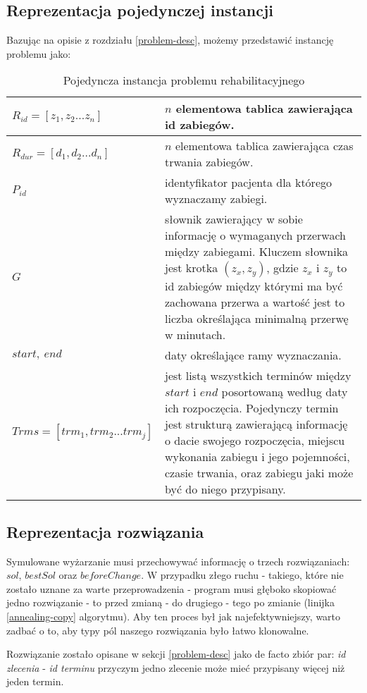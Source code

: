 \subsection{Reprezentacja pojedynczej instancji}
Bazując na opisie z rozdziału \ref{problem-desc}, możemy przedstawić instancję
problemu jako:
\begin{table}[h]
	\centering
	\begin{tabular}{ | m{} | m{} | }
	\hline
	$R_{id}=[z_1,z_2...z_n]$ & $n$ elementowa tablica zawierająca id zabiegów. \\
	\hline
	$R_{dur}=[d_1,d_2...d_n]$ & $n$ elementowa tablica zawierająca czas trwania zabiegów. \\
	\hline
	$P_{id}$ & identyfikator pacjenta dla którego wyznaczamy zabiegi. \\
	\hline
	$G$ & słownik zawierający w sobie informację o wymaganych przerwach
	między zabiegami. Kluczem słownika jest krotka $(z_x,z_y)$, gdzie $z_x$
	i $z_y$ to id zabiegów między którymi ma być zachowana przerwa a
	wartość jest to liczba określająca minimalną przerwę w minutach. \\
	\hline
	$start,\ end$ & daty określające ramy wyznaczania. \\
	\hline
	$Trms = [trm_1,trm_2...trm_j]$ & jest listą wszystkich terminów między
	$start$ i $end$ posortowaną według daty ich rozpoczęcia.
	Pojedynczy termin jest strukturą zawierającą informację o dacie
	swojego rozpoczęcia, miejscu wykonania zabiegu i jego pojemności, czasie trwania, oraz
	zabiegu jaki może być do niego przypisany.\\
	\hline
\end{tabular}
\caption{Pojedyncza instancja problemu rehabilitacyjnego}
\end{table}
\subsection{Reprezentacja rozwiązania}
Symulowane wyżarzanie musi przechowywać informację o trzech rozwiązaniach:
$sol$, $bestSol$ oraz $beforeChange$. W przypadku złego ruchu - takiego, które
nie zostało uznane za warte przeprowadzenia - program musi głęboko skopiować
jedno rozwiązanie - to przed zmianą - do drugiego - tego po zmianie
(linijka \ref{annealing-copy} algorytmu). Aby ten
proces był jak najefektywniejszy, warto zadbać o to, aby typy pól
naszego rozwiązania było łatwo klonowalne.

Rozwiązanie zostało opisane w sekcji \ref{problem-desc} jako de facto zbiór par: \emph{id
zlecenia} - \emph{id terminu} przyczym jedno zlecenie może mieć przypisany
więcej niż jeden termin. 

